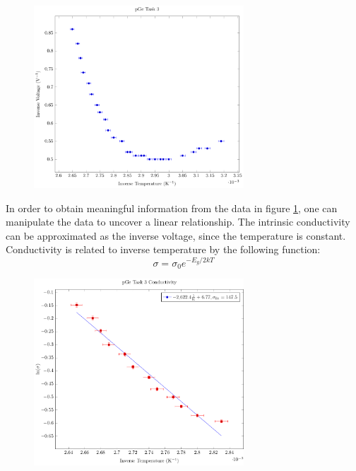\documentclass[a4paper]{article}
\begin{document}
\begin{figure}[H]
\centering
\includegraphics[width=0.7\textwidth]{PGePlots/Task3/pGeTask3Tot.pdf}
\label{task23plot}
\end{figure}

\qq In order to obtain meaningful information from the data in figure
\ref{task23plot}, one can manipulate the data to uncover a linear
relationship. The intrinsic conductivity can be approximated as the
inverse voltage, since the temperature is constant. Conductivity is
related to inverse temperature by the following function:
$$\sigma = \sigma_0 e^{-E_g/2kT}$$

\begin{figure}[H]
\centering
\includegraphics[width=0.7\textwidth]{PGePlots/Task3/pGeTask3Ln.pdf}
\label{task23plotLINEAR}
\end{figure}
\end{document}
